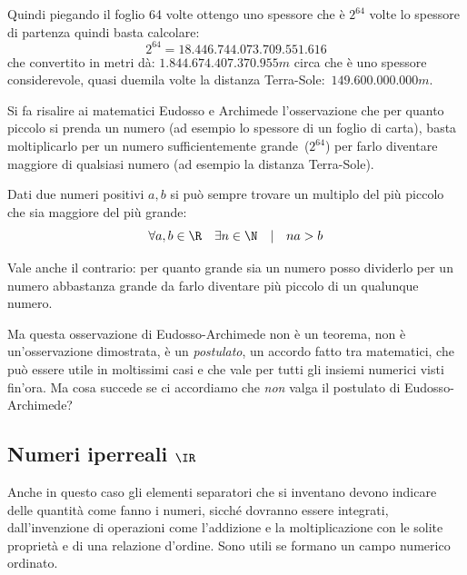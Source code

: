 Quindi piegando il foglio 64 volte ottengo uno spessore che è \(2^{64}\) 
volte lo spessore di partenza quindi basta calcolare:
\[2^{64} = 18.446.744.073.709.551.616\]
che convertito in metri dà: \(1.844.674.407.370.955m\) circa che è uno 
spessore considerevole, quasi duemila volte la distanza 
Terra-Sole:~\(149.600.000.000m\).

Si fa risalire ai matematici Eudosso e Archimede l'osservazione che per 
quanto piccolo si prenda un numero (ad esempio lo spessore di un foglio di 
carta), basta moltiplicarlo per un numero sufficientemente 
grande~(\(2^{64}\)) per farlo diventare maggiore di qualsiasi numero (ad 
esempio la distanza Terra-Sole).

\begin{postulato}
Dati due numeri positivi \(a, b\) si può sempre trovare un 
multiplo del più piccolo che sia maggiore del più grande:
\[\forall a, b \in \R \quad \exists n \in \N \quad | \quad na>b\]
\end{postulato}

Vale anche il contrario: per quanto grande sia un numero posso dividerlo 
per un numero abbastanza grande da farlo diventare più piccolo di un 
qualunque numero.

Ma questa osservazione di Eudosso-Archimede non è un teorema, non è 
un'osservazione dimostrata, è un \emph{postulato}, un accordo fatto tra 
matematici, che può essere utile in moltissimi casi e che vale per tutti gli 
insiemi numerici visti fin'ora. 
Ma cosa succede se ci accordiamo che \emph{non} valga il postulato di 
Eudosso-Archimede?

\subsection{Numeri iperreali \(\IR\)}


Anche in questo caso gli elementi separatori che si inventano devono indicare 
delle quantità come fanno i numeri, sicché dovranno essere integrati, 
dall'invenzione di operazioni come l'addizione e la moltiplicazione con le 
solite proprietà e di una relazione d'ordine. Sono utili se formano un campo 
numerico ordinato.

